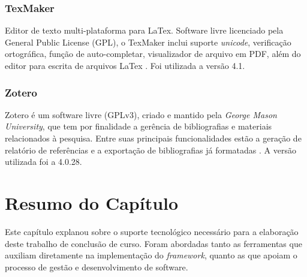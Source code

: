 \subsubsection{TexMaker}
Editor de texto multi-plataforma para LaTex. Software livre licenciado pela General Public License (GPL), o TexMaker inclui suporte \textit{unicode}, verificação ortográfica, função de auto-completar, visualizador de arquivo em PDF, além do editor para escrita de arquivos LaTex \cite{texmaker2014}. Foi utilizada a versão 4.1.

\subsubsection{Zotero}
Zotero é um software livre (GPLv3), criado e mantido pela \textit{George Mason University}, que tem por finalidade a gerência de bibliografias e materiais relacionados à pesquisa. Entre suas principais funcionalidades estão a geração de relatório de referências e a exportação de bibliografias já formatadas \cite{zotero2015}. A versão utilizada foi a 4.0.28.

\section{Resumo do Capítulo}
Este capítulo explanou sobre o suporte tecnológico necessário para a elaboração deste trabalho de conclusão de curso. Foram abordadas tanto as ferramentas que auxiliam diretamente na implementação do \textit{framework}, quanto as que apoiam o processo de gestão e desenvolvimento de software.
